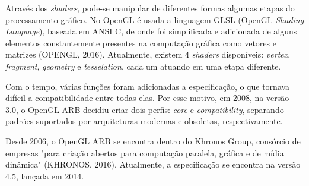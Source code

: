 Através dos \textit{shaders}, pode-se manipular de diferentes formas algumas etapas do processamento gráfico. No OpenGL é usada a linguagem GLSL (OpenGL \textit{Shading Language}), baseada em ANSI C, de onde foi simplificada e adicionada de alguns elementos constantemente presentes na computação gráfica como vetores e matrizes (OPENGL, 2016). Atualmente, existem 4 \textit{shaders} disponíveis: \textit{vertex}, \textit{fragment}, \textit{geometry} e \textit{tesselation}, cada um atuando em uma etapa diferente.

Com o tempo, várias funções foram adicionadas a especificação, o que tornava difícil a compatibilidade entre todas elas. Por esse motivo, em 2008, na versão 3.0, o OpenGL ARB decidiu criar dois perfis: \textit{core} e \textit{compatibility}, separando padrões suportados por arquiteturas modernas e obsoletas, respectivamente.

Desde 2006, o OpenGL ARB se encontra dentro do Khronos Group, consórcio de empresas "para criação abertos para computação paralela, gráfica e de mídia dinâmica" (KHRONOS, 2016). Atualmente, a especificação se encontra na versão 4.5, lançada em 2014.